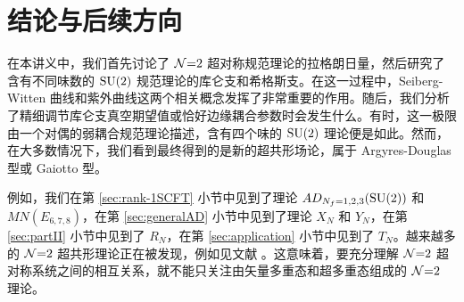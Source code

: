 \section{结论与后续方向}\label{sec:conclusions}

在本讲义中，我们首先讨论了 $\mathcal{N}{=}2$ 超对称规范理论的拉格朗日量，然后研究了含有不同味数的 $\mathop{\mathrm{SU}}(2)$ 规范理论的库仑支和希格斯支。在这一过程中，Seiberg-Witten 曲线和紫外曲线这两个相关概念发挥了非常重要的作用。随后，我们分析了精细调节库仑支真空期望值或恰好边缘耦合参数时会发生什么。有时，这一极限由一个对偶的弱耦合规范理论描述，含有四个味的 $\mathop{\mathrm{SU}}(2)$ 理论便是如此。然而，在大多数情况下，我们看到最终得到的是新的超共形场论，属于 Argyres-Douglas 型或 Gaiotto 型。

例如，我们在第 \ref{sec:rank-1SCFT} 小节中见到了理论 $AD_{N_f=1,2,3}(\mathop{\mathrm{SU}}(2))$ 和 $MN(E_{6,7,8})$，在第 \ref{sec:generalAD} 小节中见到了理论 $X_N$ 和 $Y_N$，在第 \ref{sec:partII} 小节中见到了 $R_N$，在第 \ref{sec:application} 小节中见到了 $T_N$。越来越多的 $\mathcal{N}{=}2$ 超共形理论正在被发现，例如见文献 \cite{Cecotti:2010fi,Cecotti:2012jx,Cecotti:2013lda}。这意味着，要充分理解 $\mathcal{N}{=}2$ 超对称系统之间的相互关系，就不能只关注由矢量多重态和超多重态组成的 $\mathcal{N}{=}2$ 理论。


